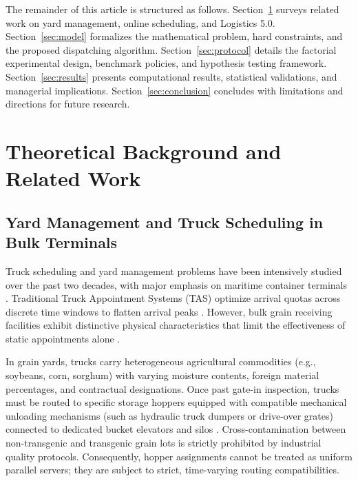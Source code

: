 \documentclass[11pt,a4paper]{article}
\begin{document}
The remainder of this article is structured as follows. Section~\ref{sec:background} surveys related work on yard management, online scheduling, and Logistics 5.0. Section~\ref{sec:model} formalizes the mathematical problem, hard constraints, and the proposed dispatching algorithm. Section~\ref{sec:protocol} details the factorial experimental design, benchmark policies, and hypothesis testing framework. Section~\ref{sec:results} presents computational results, statistical validations, and managerial implications. Section~\ref{sec:conclusion} concludes with limitations and directions for future research.

\section{Theoretical Background and Related Work}
\label{sec:background}

\subsection{Yard Management and Truck Scheduling in Bulk Terminals}
Truck scheduling and yard management problems have been intensively studied over the past two decades, with major emphasis on maritime container terminals \parencite{abdelmagidComprehensiveReviewTruck2022a}. Traditional Truck Appointment Systems (TAS) optimize arrival quotas across discrete time windows to flatten arrival peaks \parencite{azabDynamicCollaborativeTruck2017a, bouyahiaNovelTruckAppointment2025b}. However, bulk grain receiving facilities exhibit distinctive physical characteristics that limit the effectiveness of static appointments alone \parencite{t.j.herrmanUseSimulationModel2002a, turnerDiscreteEventSimulation2019a}. 

In grain yards, trucks carry heterogeneous agricultural commodities (e.g., soybeans, corn, sorghum) with varying moisture contents, foreign material percentages, and contractual designations. Once past gate-in inspection, trucks must be routed to specific storage hoppers equipped with compatible mechanical unloading mechanisms (such as hydraulic truck dumpers or drive-over grates) connected to dedicated bucket elevators and silos \parencite{r.berrutoAnalyzingReceivingOperation2001a, m.e.a.inglesEffectsGrainreceivingSystem2006a}. Cross-contamination between non-transgenic and transgenic grain lots is strictly prohibited by industrial quality protocols. Consequently, hopper assignments cannot be treated as uniform parallel servers; they are subject to strict, time-varying routing compatibilities.
\end{document}

